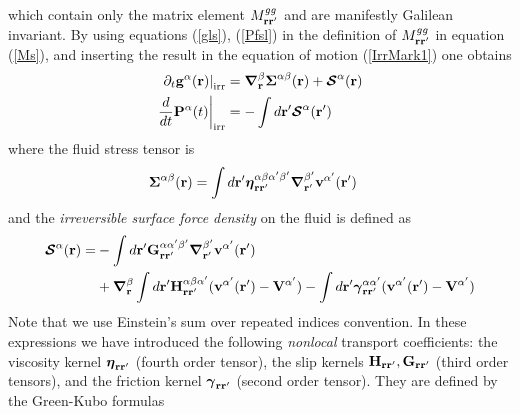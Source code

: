 \documentclass[b5paper,openright,10pt]{book}
\begin{document}
which contain only  the matrix element $M^{gg}_{{\bf  r}{\bf r}'}$ and are
manifestly  Galilean   invariant.   By  using  equations   (\ref{gls}),
(\ref{Pfsl}) {in} the  definition  of $M^{gg}_{{\bf  r}{\bf r}'}$  in
equation (\ref{Ms}),  and inserting  the result in  the equation  of motion
(\ref{IrrMark1}) one obtains
\begin{align}
\left.  \partial_t{\bf g}^\alpha({\bf r})\right|_{\rm irr}&= \boldsymbol{\nabla}_{\bf r}^{\beta}\boldsymbol{\Sigma}^{\alpha\beta}({\bf r}) +\boldsymbol{{\cal S}}^\alpha({\bf r}) 
\nonumber\\
\left.\frac{d}{dt}{\bf P}^\alpha(t)\right|_{\rm irr}&=-\int d{\bf r}'   \boldsymbol{{\cal S}}^\alpha({\bf r}')
\label{Irr}
\end{align}
where the fluid stress tensor is
\begin{align}
  \boldsymbol{\Sigma}^{\alpha\beta}({\bf r})&=
\int d{\bf r}'
\boldsymbol{\eta}^{\alpha\beta\alpha'\beta'}_{{\bf r}{\bf r}'}
\boldsymbol{\nabla}_{{\bf r}'}^{\beta'}{\bf v}^{\alpha'}({\bf r}')
\label{FluidStress}
\end{align}
and the \textit{irreversible surface force density} on the fluid is defined as
\begin{align}
  \boldsymbol{{\cal S}}^\alpha({\bf r})=&
-\int d{\bf r}'{\bf G}^{\alpha\alpha'\beta'}_{{\bf r}{\bf r}'}
\boldsymbol{\nabla}_{{\bf r}'}^{\beta'} {\bf v}^{\alpha'}({\bf r}')
\nonumber\\
&+\boldsymbol{\nabla}_{{\bf r}}^{\beta}\int d{\bf r}'{\bf H}^{\alpha\beta\alpha'}_{{\bf r}{\bf r}'}
( {\bf v}^{\alpha'}({\bf r}')-{\bf V}^{\alpha'})
-\int d{\bf r}'
\boldsymbol{\gamma}^{\alpha\alpha'}_{{\bf r}{\bf r}'}( {\bf v}^{\alpha'}({\bf r}')
-{\bf V}^{\alpha'})
\label{Irreversibleforces}
\end{align}
Note that we use Einstein's sum over repeated indices convention.
In   these    expressions   we    have   introduced    the   following
\textit{nonlocal}  transport   coefficients:  the   viscosity  kernel
$\boldsymbol{\eta}_{{\bf r}{\bf r}'}$ (fourth  order tensor), the slip
kernels ${\bf  H}_{{\bf r}{\bf r}'},{\bf G}_{{\bf  r}{\bf r}'}$ (third
order  tensors), and  the  friction kernel  $\boldsymbol{\gamma}_{{\bf
    r}{\bf  r}'}$ (second  order  tensor).  They  are  defined by  the
Green-Kubo formulas
\end{document}
